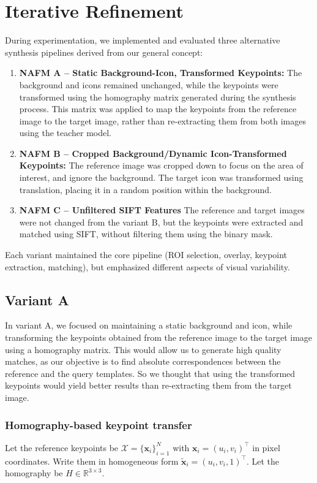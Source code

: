 \section{Iterative Refinement}
During experimentation, we implemented and evaluated three alternative
synthesis pipelines derived from our general concept:
\begin{enumerate}
    \item \textbf{NAFM A – Static Background-Icon, Transformed Keypoints:}
          The background and icons remained unchanged, while the keypoints were transformed using the homography matrix generated during the synthesis process. This matrix was applied to map the keypoints from the reference image to the target image, rather than re-extracting them from both images using the teacher model.
    \item \textbf{NAFM B – Cropped Background/Dynamic Icon-Transformed Keypoints:}
          The reference image was cropped down to focus on the area of interest, and ignore the background. The target icon was transformed using translation, placing it in a random position within the background.
    \item \textbf{NAFM C – Unfiltered SIFT Features}
          The reference and target images were not changed from the variant B, but the keypoints were extracted and matched using SIFT, without filtering them using the binary mask.
\end{enumerate}
Each variant maintained the core pipeline (ROI selection, overlay, keypoint extraction, matching), but emphasized different aspects of visual variability.
\subsection{Variant A}
In variant A, we focused on maintaining a static background and icon, while
transforming the keypoints obtained from the reference image to the target
image using a homography matrix. This would allow us to generate high quality
matches, as our objective is to find absolute correspondences between the
reference and the query templates. So we thought that using the transformed
keypoints would yield better results than re-extracting them from the target
image.
\subsubsection{Homography-based keypoint transfer}

Let the reference keypoints be $\mathcal{X}=\{ \mathbf{x}_i \}_{i=1}^{N}$ with
$\mathbf{x}_i=(u_i,v_i)^\top$ in pixel coordinates. Write them in homogeneous
form $\tilde{\mathbf{x}}_i=(u_i,v_i,1)^\top$. Let the homography be
$H\in\mathbb{R}^{3\times 3}$.

